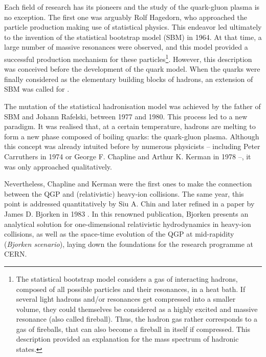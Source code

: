 Each field of research has its pioneers and the study of the quark-gluon plasma is no exception. The first one was arguably Rolf Hagedorn, who approached the particle production making use of statistical physics. This endeavor led ultimately to the invention of the statistical bootstrap model (SBM) in 1964. At that time, a large number of massive resonances were observed, and this model provided a successful production mechanism for these particles\footnote{The statistical bootstrap model considers a gas of interacting hadrons, composed of all possible particles and their resonances, in a heat bath. If several light hadrons and/or resonances get compressed into a smaller volume, they could themselves be considered as a highly excited and massive resonance (also called fireball). Thus, the hadron gas rather corresponds to a gas of fireballs, that can also become a fireball in itself if compressed. This description provided an explanation for the mass spectrum of hadronic states.}. However, this description was conceived before the development of the quark model. When the quarks were finally considered as the elementary building blocks of hadrons, an extension of SBM was called for \cite{rafelskiMeltingHadronsBoiling2015a}.

The mutation of the statistical hadronisation model was achieved by the father of SBM and Johann Rafelski, between 1977 and 1980. This process led to a new paradigm. It was realised that, at a certain temperature, hadrons are melting to form a new phase composed of boiling quarks: the quark-gluon plasma. Although this concept was already intuited before by numerous physicists -- including Peter Carruthers in 1974 \cite{rafelskiMeltingHadronsBoiling2015} or George F. Chapline and Arthur K. Kerman in 1978 \cite{chaplinePossibilityMakingQuark1978} --, it was only approached qualitatively.

Nevertheless, Chapline and Kerman were the first ones to make the connection between the QGP and (relativistic) heavy-ion collisions. The same year, this point is addressed quantitatively by Siu A. Chin\cite{chinTransitionHotQuark1978a} and later refined in a paper by James D. Bjorken in 1983 \cite{bjorkenHighlyRelativisticNucleusnucleus1983}. In this renowned publication, Bjorken presents an analytical solution for one-dimensional relativistic hydrodynamics in heavy-ion collisions, as well as the space-time evolution of the QGP at mid-rapidity (\textit{Bjorken scenario}), laying down the foundations for the research programme at CERN.\\

